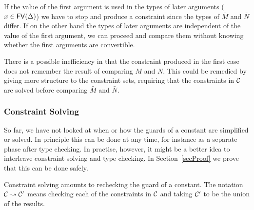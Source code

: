 If the value of the first argument is used in the types of later arguments ($x
\in \mathsf{FV}({\Delta})$) we have to stop and produce a constraint since the types of
$\bar M$ and $\bar N$ differ. If on the other hand the types of later arguments
are independent of the value of the first argument, we can proceed and compare
them without knowing whether the first arguments are convertible.

There is a possible inefficiency in that the constraint produced in the first
case does not remember the result of comparing $M$ and $N$. This could be
remedied by giving more structure to the constraint sets, requiring that the
constraints in $\mathcal{C}$ are solved before comparing $\bar M$ and $\bar N$.

\subsubsection{Constraint Solving}

So far, we have not looked at when or how the guards of a constant are
simplified or solved. In principle this can be done at any time, for instance
as a separate phase after type checking. In practise, however, it might be a
better idea to interleave constraint solving and type checking. In
Section~\ref{secProof} we prove that this can be done safely.

Constraint solving amounts to rechecking the guard of a constant. The notation
${\mathcal{C}} \leadsto {\mathcal{C}^\prime}$ means checking each of the constraints in $\mathcal{C}$
and taking $\mathcal{C}^\prime$ to be the union of the results.



